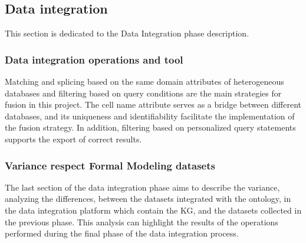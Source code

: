 \subsection{Data integration}
This section is dedicated to the Data Integration phase description.

\subsubsection{Data integration operations and tool}
Matching and splicing based on the same domain attributes of heterogeneous databases and filtering based on query conditions are the main strategies for fusion in this project. The cell name attribute serves as a bridge between different databases, and its uniqueness and identifiability facilitate the implementation of the fusion strategy. In addition, filtering based on personalized query statements supports the export of correct results.

\subsubsection{Variance respect Formal Modeling datasets}
The last section of the data integration phase aims to describe the variance, analyzing the differences, between the datasets integrated with the ontology, in the data integration platform which contain the KG, and the datasets collected in the previous phase. This analysis can highlight the results of the operations performed during the final phase of the data integration process.

